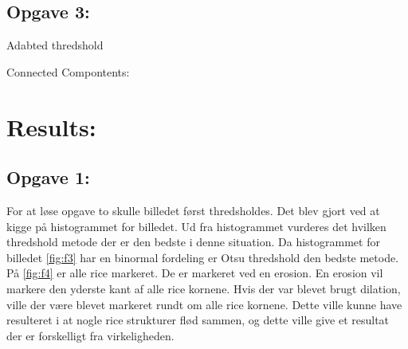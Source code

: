 \documentclass{article}
\begin{document}
\subsection{Opgave 3:}
Adabted thredshold

Connected Compontents:



\section{Results:}
\subsection{Opgave 1:}
For at løse opgave to skulle billedet først thredsholdes. Det blev gjort ved at kigge på histogrammet for billedet. Ud fra histogrammet vurderes det hvilken thredshold metode der er den bedste i denne situation. Da histogrammet for billedet \ref{fig:f3} har en binormal fordeling er Otsu thredshold den bedste metode.\newline
På \ref{fig:f4} er alle rice markeret. De er markeret ved en erosion. En erosion vil markere den yderste kant af alle rice kornene. Hvis der var blevet brugt dilation, ville der være blevet markeret rundt om alle rice kornene. Dette ville kunne have resulteret i at nogle rice strukturer flød sammen, og dette ville give et resultat der er forskelligt fra virkeligheden.  
\end{document}
